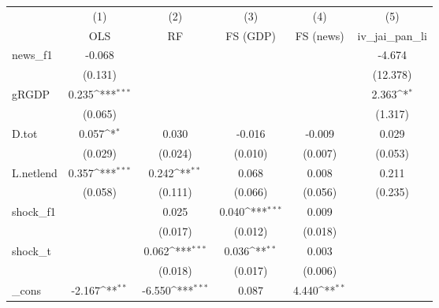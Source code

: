 {
\def\sym#1{\ifmmode^{#1}\else\(^{#1}\)\fi}
\begin{tabular}{l*{5}{c}}
\toprule
            &\multicolumn{1}{c}{(1)}&\multicolumn{1}{c}{(2)}&\multicolumn{1}{c}{(3)}&\multicolumn{1}{c}{(4)}&\multicolumn{1}{c}{(5)}\\
            &\multicolumn{1}{c}{OLS}&\multicolumn{1}{c}{RF}&\multicolumn{1}{c}{FS (GDP)}&\multicolumn{1}{c}{FS (news)}&\multicolumn{1}{c}{iv\_jai\_pan\_li}\\
\midrule
news\_f1     &      -0.068         &                     &                     &                     &      -4.674         \\
            &     (0.131)         &                     &                     &                     &    (12.378)         \\
\addlinespace
gRGDP       &       0.235\sym{***}&                     &                     &                     &       2.363\sym{*}  \\
            &     (0.065)         &                     &                     &                     &     (1.317)         \\
\addlinespace
D.tot       &       0.057\sym{*}  &       0.030         &      -0.016         &      -0.009         &       0.029         \\
            &     (0.029)         &     (0.024)         &     (0.010)         &     (0.007)         &     (0.053)         \\
\addlinespace
L.netlend   &       0.357\sym{***}&       0.242\sym{**} &       0.068         &       0.008         &       0.211         \\
            &     (0.058)         &     (0.111)         &     (0.066)         &     (0.056)         &     (0.235)         \\
\addlinespace
shock\_f1    &                     &       0.025         &       0.040\sym{***}&       0.009         &                     \\
            &                     &     (0.017)         &     (0.012)         &     (0.018)         &                     \\
\addlinespace
shock\_t     &                     &       0.062\sym{***}&       0.036\sym{**} &       0.003         &                     \\
            &                     &     (0.018)         &     (0.017)         &     (0.006)         &                     \\
\addlinespace
\_cons      &      -2.167\sym{**} &      -6.550\sym{***}&       0.087         &       4.440\sym{**} &                     \\

\end{tabular}}
